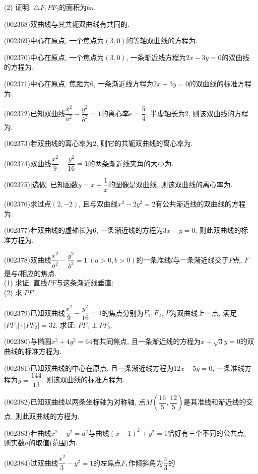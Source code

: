 (2) 证明: $\triangle F_1PF_2$的面积为$bn$.
\item (002368)双曲线与其共轭双曲线有共同的.
\item (002369)中心在原点, 一个焦点为$(3,0)$的等轴双曲线的方程为.
\item (002370)中心在原点, 一个焦点为$(3,0)$, 一条渐近线方程为$2x-3y=0$的双曲线的方程为.
\item (002371)中心在原点, 焦距为$6$, 一条渐近线方程为$2x-3y=0$的双曲线的标准方程为.
\item (002372)已知双曲线$\dfrac{x^2}{a^2}-\dfrac{y^2}{b^2}=1$的离心率$e=\dfrac{5}{4}$, 半虚轴长为$2$, 则该双曲线的方程为.
\item (002373)若双曲线的离心率为$2$, 则它的共轭双曲线的离心率为.
\item (002374)双曲线$\dfrac{x^2}{9}-\dfrac{y^2}{16}=1$的两条渐近线夹角的大小为.
\item (002375)[选做]
已知函数$y=x+\dfrac{1}{x}$的图像是双曲线, 则该双曲线的离心率为.
\item (002376)求过点$(2,-2)$, 且与双曲线$x^2-2y^2=2$有公共渐近线的双曲线的方程为.
\item (002377)若双曲线的虚轴长为$6$, 一条渐近线的方程为$3x-y=0$, 则此双曲线的标准方程为.
\item (002378)双曲线$\dfrac{x^2}{a^2}-\dfrac{y^2}{b^2}=1 \ (a>0,b>0)$的一条准线$l$与一条渐近线交于$P$点, $F$是与$l$相应的焦点.\\ 
(1) 求证: 直线$PF$与这条渐近线垂直;\\ 
(2) 求$|PF|$.
\item (002379)已知双曲线$\dfrac{x^2}{9}-\dfrac{y^2}{16}=1$的焦点分别为$F_1,F_2$, $P$为双曲线上一点, 满足
$|PF_1|\cdot|PF_2|=32$. 求证: $PF_1\perp PF_2$.
\item (002380)与椭圆$x^2+4y^2=64$有共同焦点, 且一条渐近线的方程为$x+\sqrt{3}y=0$的双曲线的标准方程为.
\item (002381)已知双曲线的中心在原点, 且一条渐近线方程为$12x-5y=0$, 一条准线方程为$y=\dfrac{144}{13}$, 则该双曲线的标准方程为.
\item (002382)已知双曲线以两条坐标轴为对称轴, 点$M(\dfrac{16}{5},\dfrac{12}{5})$是其准线和渐近线的交点, 则此双曲线的方程为.
\item (002383)若曲线$x^2-y^2=a^2$与曲线$(x-1)^2+y^2=1$恰好有三个不同的公共点, 则实数$a$的取值(范围)为.
\item (002384)过双曲线$\dfrac{{{x}^{2}}}{3}-{{y}^{2}}=1$的左焦点${{F}_{1}}$作倾斜角为$\dfrac{\pi}{3}$的
